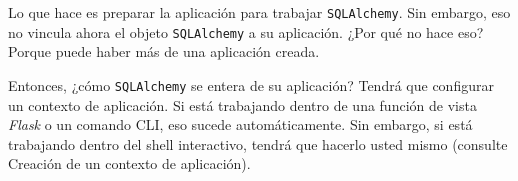 \documentclass[10pt,letterpaper,notumble]{leaflet}
\begin{document}
    
    
    Lo que hace es preparar la aplicación para trabajar \texttt{SQLAlchemy}. Sin embargo, eso no vincula ahora el objeto \texttt{SQLAlchemy} a su aplicación. ¿Por qué no hace eso? Porque puede haber más de una aplicación creada.
    
    Entonces, ¿cómo \texttt{SQLAlchemy} se entera de su aplicación? Tendrá que configurar un contexto de aplicación. Si está trabajando dentro de una función de vista \textit{Flask} o un comando CLI, eso sucede automáticamente. Sin embargo, si está trabajando dentro del shell interactivo, tendrá que hacerlo usted mismo (consulte Creación de un contexto de aplicación).
    
    \thispagestyle{empty}
    
\end{document}
